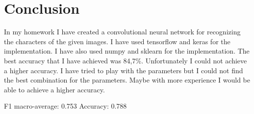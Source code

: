 \documentclass[11pt,a4paper,oneside]{report}
\begin{document}
\chapter{Conclusion}

In my homework I have created a convolutional neural network for recognizing the characters of the given images.
I have used tensorflow and keras for the implementation. I have also used numpy and sklearn for the implementation. The  best accuracy that I have achieved was 84,7\%.
Unfortunately I could not achieve a higher accuracy. I have tried to play with the parameters but I could not find the best combination for the parameters. Maybe with more experience I would be able to achieve a higher accuracy.

F1 macro-average: 0.753
Accuracy: 0.788
\end{document}
